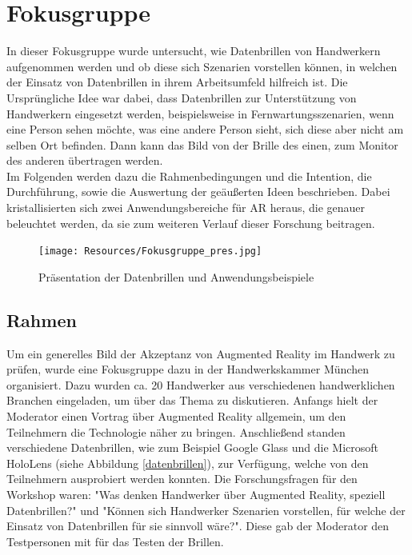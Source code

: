 \chapter{Fokusgruppe}

In dieser Fokusgruppe wurde untersucht, wie Datenbrillen von Handwerkern aufgenommen werden und ob diese sich Szenarien vorstellen können, in welchen der Einsatz von Datenbrillen in ihrem Arbeitsumfeld hilfreich ist. Die Ursprüngliche Idee war dabei, dass Datenbrillen zur Unterstützung von Handwerkern eingesetzt werden, beispielsweise in Fernwartungsszenarien, wenn eine Person sehen möchte, was eine andere Person sieht, sich diese aber nicht am selben Ort befinden. Dann kann das Bild von der Brille des einen, zum Monitor des anderen übertragen werden. \\
Im Folgenden werden dazu die Rahmenbedingungen und die Intention, die Durchführung, sowie die Auswertung der geäußerten Ideen beschrieben. Dabei kristallisierten sich zwei Anwendungsbereiche für AR heraus, die genauer beleuchtet werden, da sie zum weiteren Verlauf dieser Forschung beitragen.

\begin{figure}[h]
	\begin{center}
		\noindent\texttt{[image: Resources/Fokusgruppe\_pres.jpg]}
		\caption{Präsentation der Datenbrillen und Anwendungsbeispiele}
	\end{center}
\end{figure}

\section{Rahmen}

Um ein generelles Bild der Akzeptanz von Augmented Reality im Handwerk zu prüfen, wurde eine Fokusgruppe dazu in der Handwerkskammer München organisiert. Dazu wurden ca. 20 Handwerker aus verschiedenen handwerklichen Branchen eingeladen, um über das Thema zu diskutieren. Anfangs hielt der Moderator einen Vortrag über Augmented Reality allgemein, um den Teilnehmern die Technologie näher zu bringen. Anschließend standen verschiedene Datenbrillen, wie zum Beispiel Google Glass und die Microsoft HoloLens (siehe Abbildung \ref{datenbrillen}), zur Verfügung, welche von den Teilnehmern ausprobiert werden konnten. Die Forschungsfragen für den Workshop waren: "Was denken Handwerker über Augmented Reality, speziell Datenbrillen?" und "Können sich Handwerker Szenarien vorstellen, für welche der Einsatz von Datenbrillen für sie sinnvoll wäre?". Diese gab der Moderator den Testpersonen mit für das Testen der Brillen.


